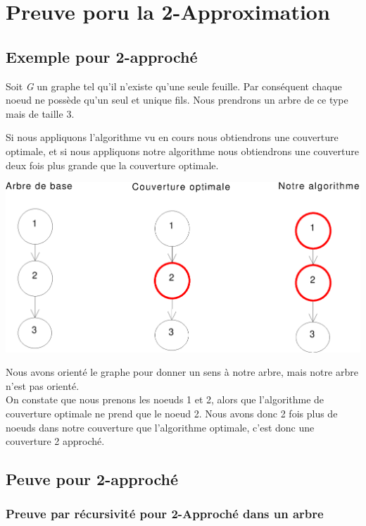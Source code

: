 \section{Preuve poru la 2-Approximation}

\subsection{Exemple pour 2-approch\'e}

Soit \textit{G} un graphe tel qu'il n'existe qu'une seule feuille. Par
cons\'equent chaque noeud ne poss\`ede qu'un seul et unique fils. Nous
prendrons un arbre de ce type mais de taille 3.

Si nous appliquons l'algorithme vu en cours nous obtiendrons une
couverture optimale, et si nous appliquons notre algorithme nous
obtiendrons une couverture deux fois plus grande que la couverture optimale.


\bigskip


\includegraphics[width=15cm]{arbredoublecouverture}

Nous avons orient\'e le graphe pour donner un sens \`a notre arbre,
mais notre arbre n'est pas orient\'e.\\
On constate que nous prenons les noeuds 1 et 2, alors que l'algorithme
de couverture optimale ne prend que le noeud 2. Nous avons donc 2 fois
plus de noeuds dans notre couverture que l'algorithme optimale, c'est
donc une couverture 2 approch\'e.

\subsection{Peuve pour 2-approch\'e}

\subsubsection{Preuve par r\'ecursivit\'e pour 2-Approch\'e dans un arbre}

